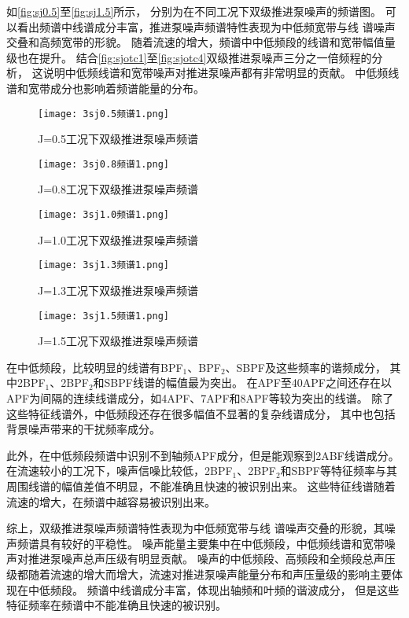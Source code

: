 如\autoref{fig:sj0.5}至\autoref{fig:sj1.5}所示，
分别为在不同工况下双级推进泵噪声的频谱图。
可以看出频谱中线谱成分丰富，推进泵噪声频谱特性表现为中低频宽带与线
谱噪声交叠和高频宽带的形貌。
随着流速的增大，频谱中中低频段的线谱和宽带幅值量级也在提升。
结合\autoref{fig:sjotc1}至\autoref{fig:sjotc4}双级推进泵噪声三分之一倍频程的分析，
这说明中低频线谱和宽带噪声对推进泵噪声都有非常明显的贡献。
中低频线谱和宽带成分也影响着频谱能量的分布。
\begin{figure}[htbp]
    \centering
    \texttt{[image: 3sj0.5频谱1.png]}
    \caption{\label{fig:sj0.5}J=0.5工况下双级推进泵噪声频谱}
\end{figure}
\begin{figure}[htbp]
    \centering
    \texttt{[image: 3sj0.8频谱1.png]}
    \caption{\label{fig:sj0.8}J=0.8工况下双级推进泵噪声频谱}
\end{figure}
\begin{figure}[htbp]
    \centering
    \texttt{[image: 3sj1.0频谱1.png]}
    \caption{\label{fig:sj1.0}J=1.0工况下双级推进泵噪声频谱}
\end{figure}
\begin{figure}[htbp]
    \centering
    \texttt{[image: 3sj1.3频谱1.png]}
    \caption{\label{fig:sj1.3}J=1.3工况下双级推进泵噪声频谱}
\end{figure}
\begin{figure}[htbp]
    \centering
    \texttt{[image: 3sj1.5频谱1.png]}
    \caption{\label{fig:sj1.5}J=1.5工况下双级推进泵噪声频谱}
\end{figure}

在中低频段，比较明显的线谱有BPF$_1$、BPF$_2$、SBPF及这些频率的谐频成分，
其中2BPF$_1$、2BPF$_2$和SBPF线谱的幅值最为突出。
在APF至40APF之间还存在以APF为间隔的连续线谱成分，如4APF、7APF和8APF等较为突出的线谱。
除了这些特征线谱外，中低频段还存在很多幅值不显著的复杂线谱成分，
其中也包括背景噪声带来的干扰频率成分。

此外，在中低频段频谱中识别不到轴频APF成分，但是能观察到2ABF线谱成分。
在流速较小的工况下，噪声信噪比较低，2BPF$_1$、2BPF$_2$和SBPF等特征频率与其周围线谱的幅值差值不明显，不能准确且快速的被识别出来。
这些特征线谱随着流速的增大，在频谱中越容易被识别出来。

综上，双级推进泵噪声频谱特性表现为中低频宽带与线
谱噪声交叠的形貌，其噪声频谱具有较好的平稳性。
噪声能量主要集中在中低频段，中低频线谱和宽带噪声对推进泵噪声总声压级有明显贡献。
噪声的中低频段、高频段和全频段总声压级都随着流速的增大而增大，流速对推进泵噪声能量分布和声压量级的影响主要体现在中低频段。
频谱中线谱成分丰富，体现出轴频和叶频的谐波成分，
但是这些特征频率在频谱中不能准确且快速的被识别。

